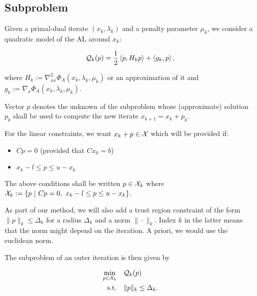 \documentclass[10pt]{article}
\numberwithin{equation}{section}
\begin{document}
	 \subsection{Subproblem}\label{subsec:subproblem}
	 
	 Given a primal-dual iterate $(x_k,\lambda_k)$ and a penalty parameter $\mu_k$, we consider a quadratic model of the AL around $x_k$:
	 
	 \begin{equation}\label{eq:quadratic_al}
	 	{\mathcal{Q}}_k(p) = \dfrac{1}{2}\left\langle {p} , {H_kp} \right\rangle + \left\langle {g_k} , {p} \right\rangle,
	 \end{equation}
	 
	 where $H_k:=\nabla^2_{xx} \Phi_A(x_k,\lambda_k,\mu_k)$ or an approximation of it and $g_k:=\nabla_x \Phi_A(x_k,\lambda_k,\mu_k)$.
	 
	 Vector $p$ denotes the unknown of the subproblem whose (approximate) solution $p_k$ shall be used to compute the new iterate $x_{k+1}=x_k+p_k$.
	 
	 For the linear constraints, we want $x_k+p\in {\mathcal{X}}$ which will be provided if:
	 \begin{itemize}
	 	\item \(Cp=0\) (provided that $Cx_0=b$)
	 	\item$ x_k-l \le p \le u-x_k$
	 \end{itemize}
	 The above conditions shall be written $p\in {\mathcal{X}}_k$ where ${\mathcal{X}}_k:= \left\{p \ | \ Cp=0,\ x_k-l \le p \le u-x_k\right\}$.
	 
	As part of our method, we will also add a trust region constraint of the form $\|p\|_k \le \Delta_k$ for a radius $\Delta_k$ and a norm $\|\cdot\|_k$. Index $k$ in the latter means that the norm might depend on the iteration. A priori, we would use the euclidean norm.
	
	The subproblem of an outer iteration is then given by
	
	\begin{equation}\label{eq:qsubpb_general_form} 
		\begin{aligned}
			\min_{p\in {\mathcal{X}}_k} \quad& {\mathcal{Q}}_k(p)  \\
			\text{s.t.}  \quad &  \|p\|_k \le \Delta_k.
		\end{aligned}	
	\end{equation}
	
\end{document}
